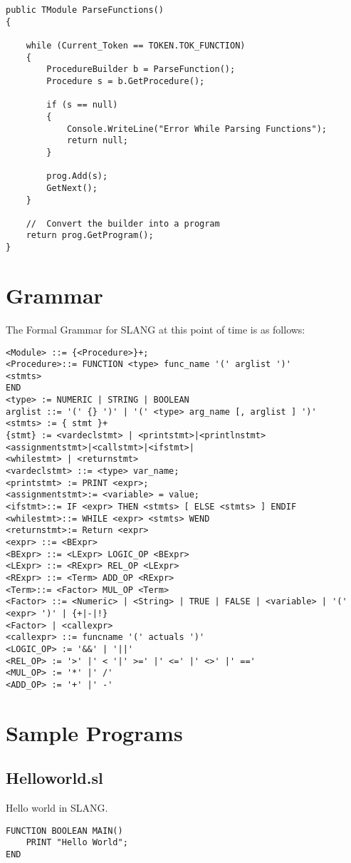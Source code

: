 \lstset{style=csharp}
\begin{lstlisting}
public TModule ParseFunctions()
{

    while (Current_Token == TOKEN.TOK_FUNCTION)
    {
        ProcedureBuilder b = ParseFunction();
        Procedure s = b.GetProcedure();

        if (s == null)
        {
            Console.WriteLine("Error While Parsing Functions");
            return null;
        }

        prog.Add(s);
        GetNext();
    }

    //  Convert the builder into a program
    return prog.GetProgram();
}
\end{lstlisting}
\section{Grammar}
The Formal Grammar for SLANG at this point of time is as follows:

\lstset{style=csharp}
\begin{lstlisting}
<Module> ::= {<Procedure>}+;
<Procedure>::= FUNCTION <type> func_name '(' arglist ')'
<stmts>
END
<type> := NUMERIC | STRING | BOOLEAN
arglist ::= '(' {} ')' | '(' <type> arg_name [, arglist ] ')'
<stmts> := { stmt }+
{stmt} := <vardeclstmt> | <printstmt>|<printlnstmt>
<assignmentstmt>|<callstmt>|<ifstmt>|
<whilestmt> | <returnstmt>
<vardeclstmt> ::= <type> var_name;
<printstmt> := PRINT <expr>;
<assignmentstmt>:= <variable> = value;
<ifstmt>::= IF <expr> THEN <stmts> [ ELSE <stmts> ] ENDIF
<whilestmt>::= WHILE <expr> <stmts> WEND
<returnstmt>:= Return <expr>
<expr> ::= <BExpr>
<BExpr> ::= <LExpr> LOGIC_OP <BExpr>
<LExpr> ::= <RExpr> REL_OP <LExpr>
<RExpr> ::= <Term> ADD_OP <RExpr>
<Term>::= <Factor> MUL_OP <Term>
<Factor> ::= <Numeric> | <String> | TRUE | FALSE | <variable> | '(' <expr> ')' | {+|-|!}
<Factor> | <callexpr>
<callexpr> ::= funcname '(' actuals ')'
<LOGIC_OP> := '&&' | '||'
<REL_OP> := '>' |' < '|' >=' |' <=' |' <>' |' =='
<MUL_OP> := '*' |' /'
<ADD_OP> := '+' |' -'
\end{lstlisting}
\section{Sample Programs}
\subsection{Helloworld.sl}
Hello world in SLANG.
\lstset{style=csharp}
\begin{lstlisting}
FUNCTION BOOLEAN MAIN()
	PRINT "Hello World";
END
\end{lstlisting}

